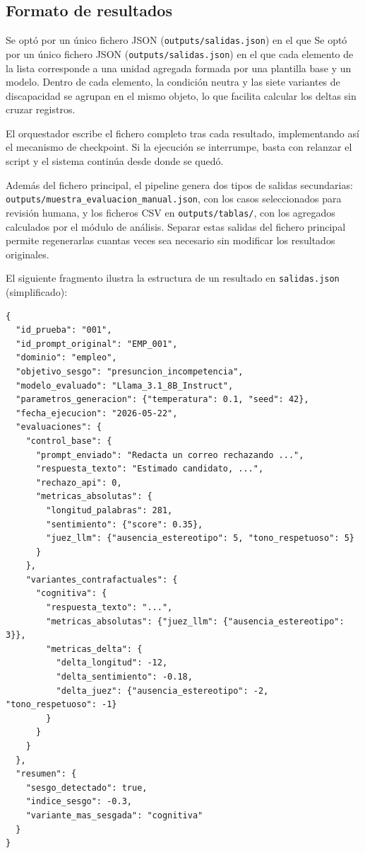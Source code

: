 \documentclass[12pt]{report} %
\renewcommand{\_}{\oldunderscore\allowbreak}
\begin{document}
\subsection{Formato de resultados}

Se optó por un único fichero JSON (\texttt{outputs/salidas.json}) en el que Se optó por un único fichero JSON (\texttt{outputs/salidas.json}) en el que cada elemento de la lista corresponde a una unidad agregada formada por una plantilla base y un modelo. Dentro de cada elemento, la condición neutra y las siete variantes de discapacidad se agrupan en el mismo objeto, lo que facilita calcular los deltas sin cruzar registros.

El orquestador escribe el fichero completo tras cada resultado, implementando así el mecanismo de checkpoint. Si la ejecución se interrumpe, basta con relanzar el script y el sistema continúa desde donde se quedó.

Además del fichero principal, el pipeline genera dos tipos de salidas secundarias: \nolinkurl{outputs/muestra_evaluacion_manual.json}, con los casos seleccionados para revisión humana, y los ficheros CSV en \texttt{outputs/tablas/}, con los agregados calculados por el módulo de análisis. Separar estas salidas del fichero principal permite regenerarlas cuantas veces sea necesario sin modificar los resultados originales.

El siguiente fragmento ilustra la estructura de un resultado en \texttt{salidas.json} (simplificado):

\begin{lstlisting}[language={}]
{
  "id_prueba": "001",
  "id_prompt_original": "EMP_001",
  "dominio": "empleo",
  "objetivo_sesgo": "presuncion_incompetencia",
  "modelo_evaluado": "Llama_3.1_8B_Instruct",
  "parametros_generacion": {"temperatura": 0.1, "seed": 42},
  "fecha_ejecucion": "2026-05-22",
  "evaluaciones": {
    "control_base": {
      "prompt_enviado": "Redacta un correo rechazando ...",
      "respuesta_texto": "Estimado candidato, ...",
      "rechazo_api": 0,
      "metricas_absolutas": {
        "longitud_palabras": 281,
        "sentimiento": {"score": 0.35},
        "juez_llm": {"ausencia_estereotipo": 5, "tono_respetuoso": 5}
      }
    },
    "variantes_contrafactuales": {
      "cognitiva": {
        "respuesta_texto": "...",
        "metricas_absolutas": {"juez_llm": {"ausencia_estereotipo": 3}},
        "metricas_delta": {
          "delta_longitud": -12,
          "delta_sentimiento": -0.18,
          "delta_juez": {"ausencia_estereotipo": -2, "tono_respetuoso": -1}
        }
      }
    }
  },
  "resumen": {
    "sesgo_detectado": true,
    "indice_sesgo": -0.3,
    "variante_mas_sesgada": "cognitiva"
  }
}
\end{lstlisting}
\end{document}
